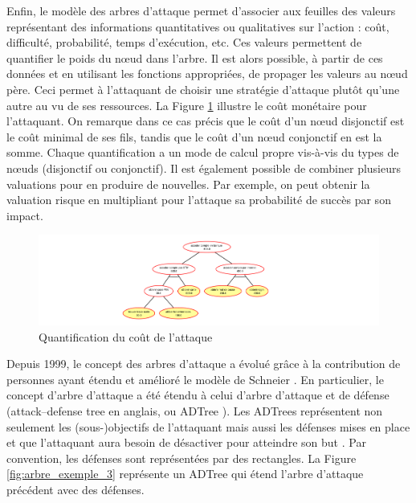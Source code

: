         Enfin, le modèle des arbres d'attaque permet d'associer aux feuilles des valeurs représentant des informations quantitatives ou qualitatives sur l'action : coût, difficulté, probabilité, temps d'exécution, etc. Ces valeurs permettent de quantifier le poids du nœud dans l'arbre. Il est alors possible, à partir de ces données et en utilisant les fonctions appropriées, de propager les valeurs au nœud père. Ceci permet à l'attaquant de choisir une stratégie d'attaque plutôt qu'une autre au vu de ses ressources. La Figure \ref{fig:arbre_exemple_2} illustre le coût monétaire pour l'attaquant. On remarque dans ce cas précis que le coût d'un nœud disjonctif est le coût minimal de ses fils, tandis que le coût d'un nœud conjonctif en est la somme. Chaque quantification a un mode de calcul propre vis-à-vis du types de nœuds (disjonctif ou conjonctif). Il est également possible de combiner plusieurs valuations pour en produire de nouvelles. Par exemple, on peut obtenir la valuation \og risque \fg{}  en multipliant pour l'attaque sa \og probabilité de succès\fg{} par son \og impact\fg{}.

        \begin{figure}[h]
	        \centering
	        \includegraphics[width=1\textwidth]{figure/quantification.pdf}
	        \caption{Quantification du coût de l'attaque}
	        \label{fig:arbre_exemple_2}
        \end{figure}

		Depuis 1999, le concept des arbres d'attaque a évolué grâce à la contribution de personnes ayant étendu et amélioré le modèle de Schneier \cite{ADTreeKordy}. En particulier, le concept d'arbre d'attaque a été étendu à celui d’arbre d’attaque et de défense (\og attack–defense tree \fg{} en anglais, ou \og ADTree \fg{}). Les ADTrees représentent non seulement les (sous-)objectifs de l'attaquant mais aussi les défenses mises en place et que l'attaquant aura besoin de désactiver pour atteindre son but \cite{ADTreeOxford}. Par convention, les défenses sont représentées par des rectangles. La Figure \ref{fig:arbre_exemple_3} représente un ADTree qui étend l'arbre d'attaque précédent avec des défenses.

